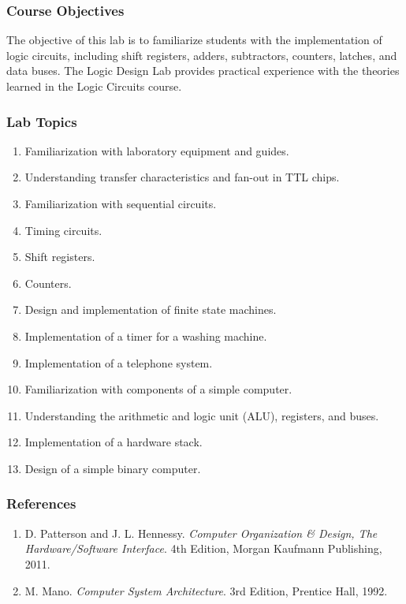 \documentclass[12pt]{article}
\begin{document}
\subsubsection*{Course Objectives}
The objective of this lab is to familiarize students with the implementation of logic circuits, including shift registers, adders, subtractors, counters, latches, and data buses. The Logic Design Lab provides practical experience with the theories learned in the Logic Circuits course.

\subsubsection*{Lab Topics}
\begin{enumerate}
    \item Familiarization with laboratory equipment and guides.
    \item Understanding transfer characteristics and fan-out in TTL chips.
    \item Familiarization with sequential circuits.
    \item Timing circuits.
    \item Shift registers.
    \item Counters.
    \item Design and implementation of finite state machines.
    \item Implementation of a timer for a washing machine.
    \item Implementation of a telephone system.
    \item Familiarization with components of a simple computer.
    \item Understanding the arithmetic and logic unit (ALU), registers, and buses.
    \item Implementation of a hardware stack.
    \item Design of a simple binary computer.
\end{enumerate}

\subsubsection*{References}
\begin{enumerate}
    \item D. Patterson and J. L. Hennessy. \textit{Computer Organization \& Design, The Hardware/Software Interface}. 4th Edition, Morgan Kaufmann Publishing, 2011.
    \item M. Mano. \textit{Computer System Architecture}. 3rd Edition, Prentice Hall, 1992.
\end{enumerate}
\end{document}
